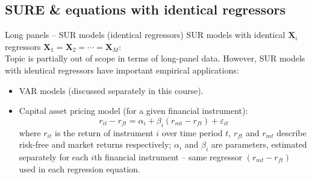 \documentclass[usenames,dvipsnames]{beamer}
\begin{document}
\subsection*{SURE \& equations with identical regressors}
\begin{frame}{Long panels -- SUR models (identical regressors)}
\small
SUR models with identical $\bm{X}_i$ regressors $\bm{X}_1=\bm{X}_2=\cdots=\bm{X}_M$:\\ \bigskip
Topic is partially out of scope in terms of long-panel data. However, SUR models with identical regressors have important empirical applications: \\ \bigskip
\begin{itemize}
    \item VAR models (discussed separately in this course).
    \bigskip
    \item Capital asset pricing model (for a given financial instrument):
    $$
    r_{it} - r_{ft} = \alpha_i + \beta_i (r_{mt} - r_{ft}) + \varepsilon_{it}
    $$
    where $r_{it}$ is the return of instrument $i$ over time period $t$, $r_{ft}$ and $r_{mt}$ describe risk-free and market returns respectively; $\alpha_i$ and $\beta_i$ are parameters, estimated separately for each $i$th financial instrument -- same regressor $(r_{mt} - r_{ft})$ used in each regression equation.
\end{itemize}
\end{frame}
\end{document}
